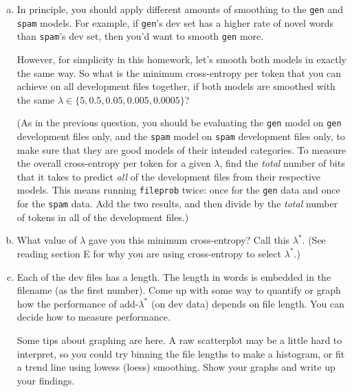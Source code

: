 \documentclass[12pt]{article}
\theoremstyle{plain}
\theoremstyle{definition}
\theoremstyle{remark}
\begin{document}
\begin{enumerate}[(a)]
In principle, you should try a lot of $\lambda$ values to find the one that does best on dev data.\footnote{Perhaps using the charming little \textit{golden-section search algorithm}, a lovely approach when you only have one hyperparameter ($\lambda$). When you have multiple hyperparameters, it is typical to use grid search, Nelder-Mead, or a randomized search algorithm.} However, for purposes of this assignment, it’s okay to try just a few $\lambda \in \{5, 0.5, 0.05, 0.005, 0.0005\}$.

\item In principle, you should apply different amounts of smoothing to the \texttt{gen} and \texttt{spam} models. For example, if \texttt{gen}’s dev set has a higher rate of novel words than \texttt{spam}’s dev set, then you’d want to smooth \texttt{gen} more.

However, for simplicity in this homework, let’s smooth both models in exactly the same way. So what is the minimum cross-entropy per token that you can achieve on all development files together, if both models are smoothed with the same $\lambda \in \{5, 0.5, 0.05, 0.005, 0.0005\}$?

(As in the previous question, you should be evaluating the \texttt{gen} model on \texttt{gen} development files only, and the \texttt{spam} model on \texttt{spam} development files only, to make sure that they are good models of their intended categories. To measure the overall cross-entropy per token for a given $\lambda$, find the \textit{total} number of bits that it takes to predict \textit{all} of the development files from their respective models. This means running \texttt{fileprob} twice: once for the \texttt{gen} data and once for the \texttt{spam} data. Add the two results, and then divide by the \textit{total} number of tokens in all of the development files.)

\item What value of $\lambda$ gave you this minimum cross-entropy? Call this $\lambda^*$. (See reading section E for why you are using cross-entropy to select $\lambda^*$.)

\item Each of the dev files has a length. The length in words is embedded in the filename (as the first number). Come up with some way to quantify or graph how the performance of add-$\lambda^*$ (on dev data) depends on file length. You can decide how to measure performance.

Some tips about graphing are here. A raw scatterplot may be a little hard to interpret, so you could try binning the file lengths to make a histogram, or fit a trend line using lowess (loess) smoothing. Show your graphs and write up your findings.


\end{enumerate}
\end{document}
